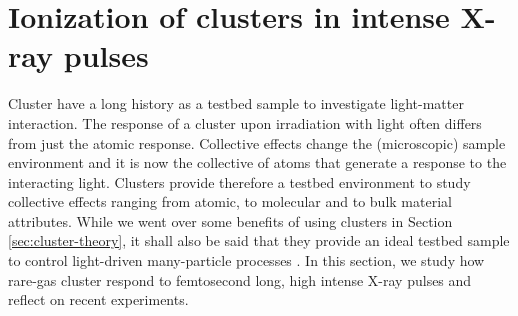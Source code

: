 \section{Ionization of clusters in intense X-ray pulses}\label{sec:ionizatin-of-ext-obj}
Cluster have a long history as a testbed sample to investigate light-matter interaction. The response of a cluster upon irradiation with light often differs from just the atomic response. Collective effects change the (microscopic) sample environment and it is now the collective of atoms that generate a response to the interacting light. Clusters provide therefore a testbed environment to study collective effects ranging from atomic, to molecular and to bulk material attributes. While we went over some benefits of using clusters in Section \ref{sec:cluster-theory}, it shall also be said that they provide an ideal testbed sample to control light-driven many-particle processes \citep{Fennel-2010-RMP}. In this section, we study how rare-gas cluster respond to femtosecond long, high intense X-ray pulses and reflect on recent experiments.
%
%
%
